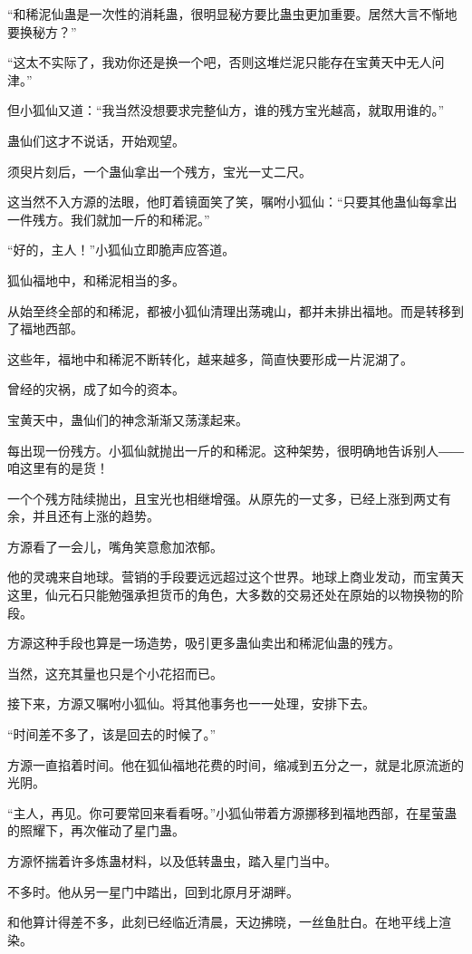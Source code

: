 \begin{this_body}
“和稀泥仙蛊是一次性的消耗蛊，很明显秘方要比蛊虫更加重要。居然大言不惭地要换秘方？”

“这太不实际了，我劝你还是换一个吧，否则这堆烂泥只能存在宝黄天中无人问津。”

但小狐仙又道：“我当然没想要求完整仙方，谁的残方宝光越高，就取用谁的。”

蛊仙们这才不说话，开始观望。

须臾片刻后，一个蛊仙拿出一个残方，宝光一丈二尺。

这当然不入方源的法眼，他盯着镜面笑了笑，嘱咐小狐仙：“只要其他蛊仙每拿出一件残方。我们就加一斤的和稀泥。”

“好的，主人！”小狐仙立即脆声应答道。

狐仙福地中，和稀泥相当的多。

从始至终全部的和稀泥，都被小狐仙清理出荡魂山，都并未排出福地。而是转移到了福地西部。

这些年，福地中和稀泥不断转化，越来越多，简直快要形成一片泥湖了。

曾经的灾祸，成了如今的资本。

宝黄天中，蛊仙们的神念渐渐又荡漾起来。

每出现一份残方。小狐仙就抛出一斤的和稀泥。这种架势，很明确地告诉别人――咱这里有的是货！

一个个残方陆续抛出，且宝光也相继增强。从原先的一丈多，已经上涨到两丈有余，并且还有上涨的趋势。

方源看了一会儿，嘴角笑意愈加浓郁。

他的灵魂来自地球。营销的手段要远远超过这个世界。地球上商业发动，而宝黄天这里，仙元石只能勉强承担货币的角色，大多数的交易还处在原始的以物换物的阶段。

方源这种手段也算是一场造势，吸引更多蛊仙卖出和稀泥仙蛊的残方。

当然，这充其量也只是个小花招而已。

接下来，方源又嘱咐小狐仙。将其他事务也一一处理，安排下去。

“时间差不多了，该是回去的时候了。”

方源一直掐着时间。他在狐仙福地花费的时间，缩减到五分之一，就是北原流逝的光阴。

“主人，再见。你可要常回来看看呀。”小狐仙带着方源挪移到福地西部，在星萤蛊的照耀下，再次催动了星门蛊。

方源怀揣着许多炼蛊材料，以及低转蛊虫，踏入星门当中。

不多时。他从另一星门中踏出，回到北原月牙湖畔。

和他算计得差不多，此刻已经临近清晨，天边拂晓，一丝鱼肚白。在地平线上渲染。


\end{this_body}
